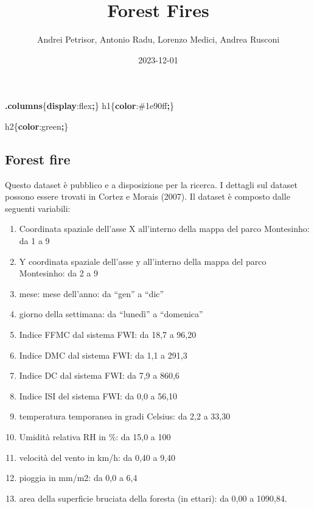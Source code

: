 \documentclass[
]{article}
\title{Forest Fires}
\author{Andrei Petrisor, Antonio Radu, Lorenzo Medici, Andrea Rusconi}
\date{2023-12-01}
\newenvironment{Shaded}{\begin{snugshade}}{\end{snugshade}}
\newcommand{\ConstantTok}[1]{\textcolor[rgb]{0.56,0.35,0.01}{#1}}
\newcommand{\DecValTok}[1]{\textcolor[rgb]{0.00,0.00,0.81}{#1}}
\newcommand{\FunctionTok}[1]{\textcolor[rgb]{0.13,0.29,0.53}{\textbf{#1}}}
\newcommand{\KeywordTok}[1]{\textcolor[rgb]{0.13,0.29,0.53}{\textbf{#1}}}
\newcommand{\NormalTok}[1]{#1}
\newcommand{\OperatorTok}[1]{\textcolor[rgb]{0.81,0.36,0.00}{\textbf{#1}}}
\providecommand{\tightlist}{%
  \setlength{\itemsep}{0pt}\setlength{\parskip}{0pt}}
\begin{document}
\maketitle

{
\setcounter{tocdepth}{2}
\tableofcontents
}
\begin{Shaded}
\begin{Highlighting}[]
\FunctionTok{.columns}\NormalTok{\{}\KeywordTok{display}\NormalTok{:}\DecValTok{flex}\OperatorTok{;}\NormalTok{\}}
\NormalTok{h1\{}\KeywordTok{color}\NormalTok{:}\ConstantTok{\#1e90ff}\OperatorTok{;}\NormalTok{\}}

\NormalTok{h2\{}\KeywordTok{color}\NormalTok{:}\ConstantTok{green}\OperatorTok{;}\NormalTok{\}}
\end{Highlighting}
\end{Shaded}

\hypertarget{forest-fire}{%
\subsection{Forest fire}\label{forest-fire}}

Questo dataset è pubblico e a disposizione per la ricerca. I dettagli
sul dataset possono essere trovati in Cortez e Morais (2007). Il dataset
è composto dalle seguenti variabili:

\begin{enumerate}
\def\labelenumi{\arabic{enumi}.}
\tightlist
\item
  Coordinata spaziale dell'asse X all'interno della mappa del parco
  Montesinho: da 1 a 9
\item
  Y coordinata spaziale dell'asse y all'interno della mappa del parco
  Montesinho: da 2 a 9
\item
  mese: mese dell'anno: da ``gen'' a ``dic''
\item
  giorno della settimana: da ``lunedì'' a ``domenica''
\item
  Indice FFMC dal sistema FWI: da 18,7 a 96,20
\item
  Indice DMC dal sistema FWI: da 1,1 a 291,3
\item
  Indice DC dal sistema FWI: da 7,9 a 860,6
\item
  Indice ISI del sistema FWI: da 0,0 a 56,10
\item
  temperatura temporanea in gradi Celsius: da 2,2 a 33,30
\item
  Umidità relativa RH in \%: da 15,0 a 100
\item
  velocità del vento in km/h: da 0,40 a 9,40
\item
  pioggia in mm/m2: da 0,0 a 6,4
\item
  area della superficie bruciata della foresta (in ettari): da 0,00 a
  1090,84.
\end{enumerate}
\end{document}
